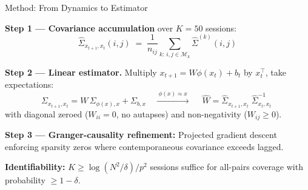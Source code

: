 \documentclass[aspectratio=169,12pt]{beamer}
\begin{document}
\begin{frame}{Method: From Dynamics to Estimator}

\textbf{Step 1 --- Covariance accumulation} over $K{=}50$ sessions:
\[
  \hat{\Sigma}_{x_{t+1},x_t}(i,j) \;=\; \frac{1}{n_{ij}}
    \sum_{k:\,i,j\in\mathcal{M}_k} \hat{\Sigma}^{(k)}(i,j)
\]

\vspace{2pt}
\textbf{Step 2 --- Linear estimator.}\;
Multiply $x_{t+1}{=}W\phi(x_t){+}b_t$ by $x_t^\top$, take expectations:
\[
  \Sigma_{x_{t+1},x_t} = W\,\Sigma_{\phi(x),x} + \Sigma_{b,x}
  \quad\xrightarrow{\;\phi(x)\approx x\;}
  \quad\boxed{\;\hat{W} = \hat{\Sigma}_{x_{t+1},x_t}\;\hat{\Sigma}_{x_t,x_t}^{-1}\;}
\]
with diagonal zeroed ($W_{ii}{=}0$, no autapses) and non-negativity ($W_{ij}{\geq}0$).

\vspace{4pt}
\textbf{Step 3 --- Granger-causality refinement:} Projected gradient descent
enforcing sparsity zeros where contemporaneous covariance exceeds lagged.

\vspace{4pt}
\textbf{Identifiability:}\;
$K \geq \log(N^2/\delta)/p^2$ sessions suffice for all-pairs coverage
with probability $\geq 1{-}\delta$.

\end{frame}
\end{document}
